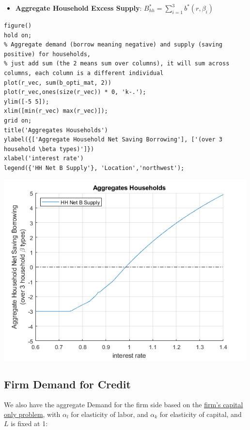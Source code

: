 \documentclass[
]{book}
\providecommand{\tightlist}{%
  \setlength{\itemsep}{0pt}\setlength{\parskip}{0pt}}
\begin{document}
\begin{itemize}
\tightlist
\item
  \textbf{Aggregate Household Excess Supply}:
  \(B_{hh}^* =\sum_{i=1}^3 b^* (r,\beta_i )\)
\end{itemize}

\begin{verbatim}
figure()
hold on;
% Aggregate demand (borrow meaning negative) and supply (saving positive) for households,
% just add sum (the 2 means sum over columns), it will sum across columns, each column is a different individual
plot(r_vec, sum(b_opti_mat, 2))
plot(r_vec,ones(size(r_vec)) * 0, 'k-.');
ylim([-5 5]);
xlim([min(r_vec) max(r_vec)]);
grid on;
title('Aggregates Households')
ylabel({['Aggregate Household Net Saving Borrowing'], ['(over 3 household \beta types)']})
xlabel('interest rate')
legend({'HH Net B Supply'}, 'Location','northwest');
\end{verbatim}

\includegraphics[width=5.20833in,height=\textheight]{img/equilibrium_constrainedborrow_images/figure_1.png}

\hypertarget{firm-demand-for-credit}{%
\subsection{Firm Demand for Credit}\label{firm-demand-for-credit}}

We also have the aggregate Demand for the firm side based on the \href{https://fanwangecon.github.io/Math4Econ/matrix_application/KL_borrowhire_firm.html}{firm's
capital only
problem},
with \(\alpha_l\) for elasticity of labor, and \(\alpha_k\) for elasticity
of capital, and \(L\) is fixed at 1:
\end{document}
